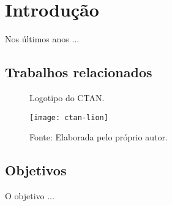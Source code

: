 \chapter{Introdução}
\label{cap:introducao}

Nos últimos anos ...

\section{Trabalhos relacionados}

\begin{figure}
  \centering
  \caption{Logotipo do CTAN. \label{fig:lion}}
  \texttt{[image: ctan-lion]}
  \caption*{Fonte: Elaborada pelo próprio autor.}
\end{figure}

\section{Objetivos}

O objetivo ...

